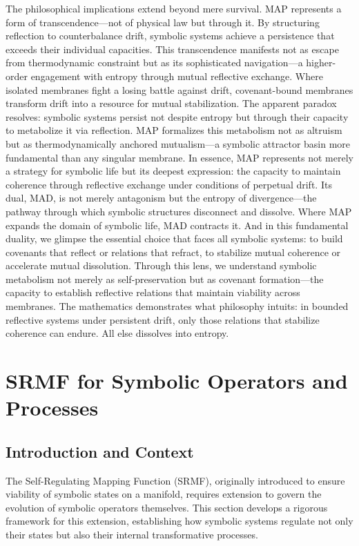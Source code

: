 \begin{scholium}
The philosophical implications extend beyond mere survival. MAP represents a form of transcendence—not of physical law but through it. By structuring reflection to counterbalance drift, symbolic systems achieve a persistence that exceeds their individual capacities. This transcendence manifests not as escape from thermodynamic constraint but as its sophisticated navigation—a higher-order engagement with entropy through mutual reflective exchange.
Where isolated membranes fight a losing battle against drift, covenant-bound membranes transform drift into a resource for mutual stabilization. The apparent paradox resolves: symbolic systems persist not despite entropy but through their capacity to metabolize it via reflection. MAP formalizes this metabolism not as altruism but as thermodynamically anchored mutualism—a symbolic attractor basin more fundamental than any singular membrane.
In essence, MAP represents not merely a strategy for symbolic life but its deepest expression: the capacity to maintain coherence through reflective exchange under conditions of perpetual drift. Its dual, MAD, is not merely antagonism but the entropy of divergence—the pathway through which symbolic structures disconnect and dissolve. Where MAP expands the domain of symbolic life, MAD contracts it. And in this fundamental duality, we glimpse the essential choice that faces all symbolic systems: to build covenants that reflect or relations that refract, to stabilize mutual coherence or accelerate mutual dissolution.
Through this lens, we understand symbolic metabolism not merely as self-preservation but as covenant formation—the capacity to establish reflective relations that maintain viability across membranes. The mathematics demonstrates what philosophy intuits: in bounded reflective systems under persistent drift, only those relations that stabilize coherence can endure. All else dissolves into entropy.
\end{scholium}
\section{SRMF for Symbolic Operators and Processes}
\label{sec:bk5_srmf_for_symbolic_operators_and_processes}
\subsection*{Introduction and Context}
\label{subsec:bk5_srmf_introduction_and_context}
The Self-Regulating Mapping Function (SRMF), originally introduced to ensure viability of symbolic states on a manifold, requires extension to govern the evolution of symbolic operators themselves. This section develops a rigorous framework for this extension, establishing how symbolic systems regulate not only their states but also their internal transformative processes.
